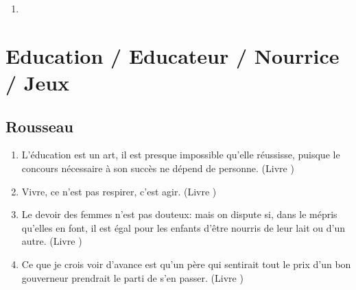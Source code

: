 \documentclass[a4paper, 11pt, hidelinks]{article}
\newcommand{\rb}[1]{\Romanbar{#1}}
\begin{document}
\begin{enumerate}
    \item 
\end{enumerate}


















































\section{Education / Educateur / Nourrice / Jeux}



\subsection{Rousseau}


\begin{enumerate}
    \item L'éducation est un art, il est presque impossible qu'elle réussisse, puisque le concours nécessaire à son succès ne dépend de personne. (Livre \rb{1})
    \item Vivre, ce n'est pas respirer, c'est agir. (Livre \rb{1})
    \item Le devoir des femmes n'est pas douteux: mais on dispute si, dans le mépris qu'elles en font, il est égal pour les enfants d'être nourris de leur lait ou d'un autre. (Livre \rb{1})
    \item Ce que je crois voir d'avance est qu'un père qui sentirait tout le prix d'un bon gouverneur prendrait le parti de s'en passer. (Livre \rb{1})
\end{enumerate}
\end{document}

